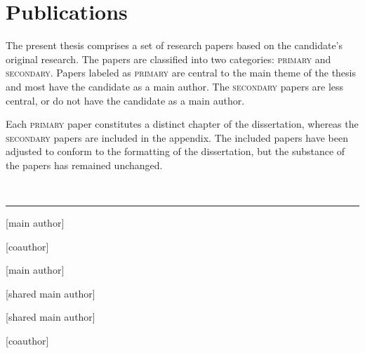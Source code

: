 
\chapter[publications]{Publications}

The present thesis comprises a set of research papers based on the candidate's original research. The papers are classified into two categories: \textsc{primary} and \textsc{secondary}. 
Papers labeled as \textsc{primary} are central to the main theme of the thesis and most have the candidate as a main author. The \textsc{secondary} papers are less central, or do not have the candidate as a main author.


\noindent Each \textsc{primary} paper constitutes a distinct chapter of the dissertation, whereas the \textsc{secondary} papers are included in the appendix. The included papers have been adjusted to conform to the formatting of the dissertation, but the substance of the papers has remained unchanged.


\vspace{5mm}

\raggedright\par\noindent\hspace{8mm}{\Large\scshape primary}\\[-2mm]

\raggedleft\rule{\textwidth - 8mm}{0.4pt}

\begin{enumerate}[leftmargin=8mm,topsep=0mm,label={[\Alph*]}]
    \item {} [main author]
    \item {} [coauthor]
    \item {} [main author]

    \item {} [shared main author]

    \item {} [shared main author]
    \item {} [coauthor]


\end{enumerate}

